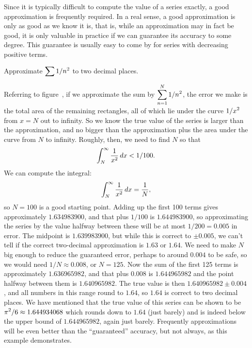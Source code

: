 Since it is typically difficult to compute the value of a series
exactly, a good approximation is frequently required. In a real sense,
a good approximation is only as good as we know it is, that is, while
an approximation may in fact be good, it is only valuable in practice
if we can guarantee its accuracy to some degree. This guarantee is
usually easy to come by for series with decreasing positive terms.

\begin{example} Approximate $\displaystyle \sum 1/n^2$ to two decimal places.

Referring to figure~,
if we approximate the sum by $\displaystyle \sum_{n=1}^N 1/n^2$, the error we make is the
total area of the remaining rectangles, all of which lie under the
curve $\displaystyle 1/x^2$ from $x=N$ out to infinity. So we know the true value of
the series is larger than the approximation, and no bigger than the
approximation plus the area under the curve from $N$ to
infinity. Roughly, then, we need to find $N$ so that 
$$\int_N^\infty {1\over x^2}\,dx < 1/100.$$
We can compute the integral:
$$\int_N^\infty {1\over x^2}\,dx = {1\over N},$$ 
so $N=100$ is a good starting point.  Adding up the first 100 terms
gives approximately $1.634983900$, and that plus $1/100$ is
$1.644983900$, so approximating the series by the value halfway
between these will be at most $1/200=0.005$ in error.  The midpoint is
$1.639983900$, but while this is correct to $\pm0.005$, we can't tell
if the correct two-decimal approximation is $1.63$ or $1.64$. We need
to make $N$ big enough to reduce the guaranteed error, perhaps to
around $0.004$ to be safe, so we would need $1/N\approx 0.008$, or
$N=125$. Now the sum of the first 125 terms is approximately
$1.636965982$, and that plus $0.008$ is $1.644965982$ and the point
halfway between them is $1.640965982$. The true value is then
$1.640965982\pm 0.004$, and all numbers in this range round to $1.64$,
so $1.64$ is correct to two decimal places. We have mentioned that
the true value of this series can be shown to be $\displaystyle
\pi^2/6\approx1.644934068$ which rounds down to $1.64$ (just barely)
and is indeed below the upper bound of $1.644965982$, again just
barely. Frequently approximations will be even better than the
``guaranteed'' accuracy, but not always, as this example demonstrates.
\end{example}

